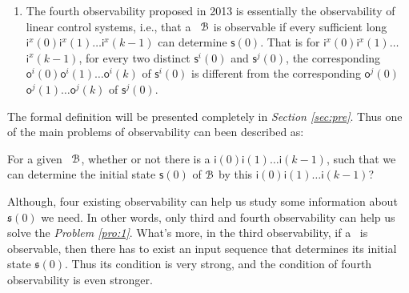 \begin{enumerate}
	\item  The fourth observability proposed in 2013 \cite{Fornasini2013Observability} is essentially the observability of linear control systems, i.e., that a \BCN\ ${\mathcal{B}}$ is observable if every sufficient long $\mathsf{i}^{x}(0)$$\mathsf{i}^{x}(1)\ldots$$\mathsf{i}^{x}(k-1)$ can determine $\mathsf{s}(0)$. That is for $\mathsf{i}^{x}(0)$$\mathsf{i}^{x}(1)\ldots$ $\mathsf{i}^{x}(k-1)$, for every two distinct $\mathsf{s}^{i}(0)$ and $\mathsf{s}^{j}(0)$, the corresponding $\mathsf{o}^{i}(0)$$\mathsf{o}^{i}(1)\ldots$$\mathsf{o}^{i}(k)$ of $\mathsf{s}^{i}(0)$ is different from the corresponding $\mathsf{o}^{j}(0)$$\mathsf{o}^{j}(1)\ldots$$\mathsf{o}^{j}(k)$ of $\mathsf{s}^{j}(0)$.%
\end{enumerate}
 The formal definition will be presented completely in {\em Section \ref{sec:pre}}.
 Thus one of the main problems of observability can been described as: 
\begin{problem}
\label{pro:1}
For a given \BCN\ ${\mathcal{B}}$, whether or not there is a $\mathsf{i}(0)\mathsf{i}(1)\ldots\mathsf{i}(k-1)$, such that we can determine the initial state $\mathsf{s}(0)$ of ${\mathcal{B}}$ by this $\mathsf{i}(0)\mathsf{i}(1)\ldots\mathsf{i}(k-1)$?
\end{problem}

\begin{comment}
\ly{In the four existing observability, we can not determine the initial state of \BCNs\ by the first and second observability.} Although we can determine the initail state of \BCNs\ by the third and fourth observability, the requirements for \BCNs\ to determine the initail state are difficult to meet. Thus, we consider that whether we can determine the initial state of some \BCNs\ which can not be determined by the third and fourth observability.
\end{comment}
Although, four existing observability can help us study some information about $\mathfrak{s}(0)$ we need. %
In other words, only third and fourth observability can help us solve the {\em Problem \ref{pro:1}}. What's more, in the third observability, if a \BCN\ is observable, then there has to exist an input sequence that determines its initial state $\mathfrak{s}(0)$. Thus its condition is very strong, and the condition of fourth observability is even stronger. 


